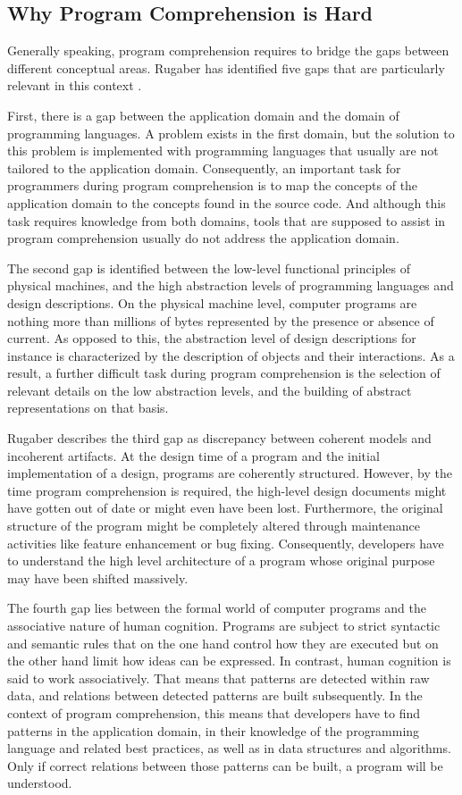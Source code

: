 \subsection{Why Program Comprehension is Hard}
\label{ss:BackgroundComprehensionDifficulties}
Generally speaking, program comprehension requires to bridge the gaps between different conceptual areas.
Rugaber has identified five gaps that are particularly relevant in this context \cite{kent_program_1996}.

First, there is a gap between the application domain and the domain of programming languages.
A problem exists in the first domain, but the solution to this problem is implemented with programming languages that usually are not tailored to the application domain.
Consequently, an important task for programmers during program comprehension is to map the concepts of the application domain to the concepts found in the source code.
And although this task requires knowledge from both domains, tools that are supposed to assist in program comprehension usually do not address the application domain.

The second gap is identified between the low-level functional principles of physical machines, and the high abstraction levels of programming languages and design descriptions.
On the physical machine level, computer programs are nothing more than millions of bytes represented by the presence or absence of current.
As opposed to this, the abstraction level of design descriptions for instance is characterized by the description of objects and their interactions.
As a result, a further difficult task during program comprehension is the selection of relevant details on the low abstraction levels, and the building of abstract representations on that basis.

Rugaber describes the third gap as discrepancy between coherent models and incoherent artifacts.
At the design time of a program and the initial implementation of a design, programs are coherently structured.
However, by the time program comprehension is required, the high-level design documents might have gotten out of date or might even have been lost.
Furthermore, the original structure of the program might be completely altered through maintenance activities like feature enhancement or bug fixing.
Consequently, developers have to understand the high level architecture of a program whose original purpose may have been shifted massively.

The fourth gap lies between the formal world of computer programs and the associative nature of human cognition.
Programs are subject to strict syntactic and semantic rules that on the one hand control how they are executed but on the other hand limit how ideas can be expressed.
In contrast, human cognition is said to work associatively.
That means that patterns are detected within raw data, and relations between detected patterns are built subsequently.
In the context of program comprehension, this means that developers have to find patterns in the application domain, in their knowledge of the programming language and related best practices, as well as in data structures and algorithms.
Only if correct relations between those patterns can be built, a program will be understood.

